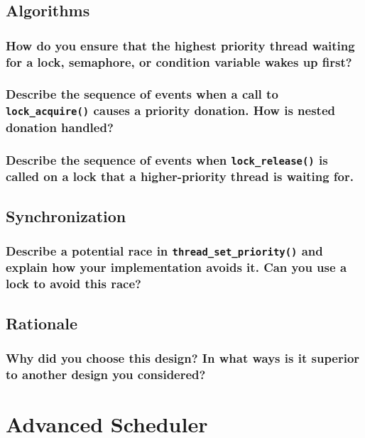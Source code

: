 \documentclass[sigconf, nonacm]{acmart}
\begin{document}
        \subsection{Algorithms}

            \subsubsection{How do you ensure that the highest priority thread waiting for a lock, semaphore, or condition variable wakes up first? }

            \subsubsection{Describe the sequence of events when a call to \texttt{lock\_acquire()} causes a priority donation. How is nested donation handled? }

            \subsubsection{Describe the sequence of events when \texttt{lock\_release()} is called on a lock that a higher-priority thread is waiting for.}

        \subsection{Synchronization}

            \subsubsection{Describe a potential race in \texttt{thread\_set\_priority()} and explain how your implementation avoids it.  Can you use a lock to avoid this race? }

        \subsection{Rationale}

            \subsubsection{Why did you choose this design? In what ways is it superior to another design you considered? }

    \section{Advanced Scheduler}
\end{document}
